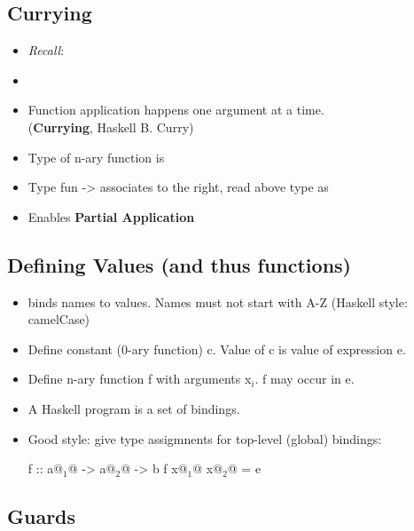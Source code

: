 \subsection{Currying}

\begin{itemize}
  \item \textit{Recall}: 
  \item {}
  \item Function application happens one argument at a time. \\ (\textbf{Currying}, Haskell B. Curry)
  \item Type of n-ary function is \\ 
  \item Type fun -> associates to the right, read above type as \\ 
  \item Enables \textbf{Partial Application}
\end{itemize}


\subsection{Defining Values (and thus functions)}

\begin{itemize}
  \item \codeline{=} binds names to values. Names must not start with A-Z (Haskell style: camelCase)
  \item Define constant (0-ary function) c. Value of c is value of expression e. \\ 
  \item Define n-ary function f with arguments x$_i$. f may occur in e. \\ 
  \item A Haskell program is a set of bindings.
  \item Good style: give type assigmnents for top-level (global) bindings:\\
  \begin{Haskell}
f :: a@$_1$@ -> a@$_2$@ -> b
f x@$_1$@ x@$_2$@ = e
  \end{Haskell}
\end{itemize}

\subsection{Guards}

